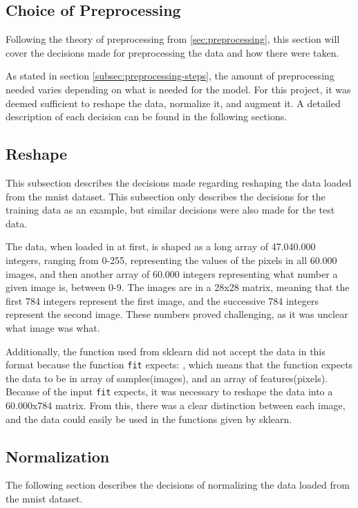 \subsection{Choice of Preprocessing}
Following the theory of preprocessing from \ref{sec:preprocessing}, this section will cover the decisions made for preprocessing the data and how there were taken.

As stated in section \ref{subsec:preprocessing-steps}, the amount of preprocessing needed varies depending on what is needed for the model. For this project, it was deemed sufficient to reshape the data, normalize it, and augment it. A detailed description of each decision can be found in the following sections.

\subsection{Reshape}
This subsection describes the decisions made regarding reshaping the data loaded from the \gls{mnist} dataset. This subsection only describes the decisions for the training data as an example, but similar decisions were also made for the test data.

The data, when loaded in at first, is shaped as a long array of 47.040.000 integers, ranging from 0-255, representing the values of the pixels in all 60.000 images, and then another array of 60.000 integers representing what number a given image is, between 0-9. The images are in a 28x28 matrix, meaning that the first 784 integers represent the first image, and the successive 784 integers represent the second image. These numbers proved challenging, as it was unclear what image was what.

Additionally, the function used from \gls{sklearn} did not accept the data in this format because the function \texttt{fit} expects: , which means that the function expects the data to be in array of samples(images), and an array of features(pixels). Because of the input \texttt{fit} expects, it was necessary to reshape the data into a 60.000x784 matrix. From this, there was a clear distinction between each image, and the data could easily be used in the functions given by \gls{sklearn}.

\subsection{Normalization}
The following section describes the decisions of normalizing the data loaded from the \gls{mnist} dataset.

